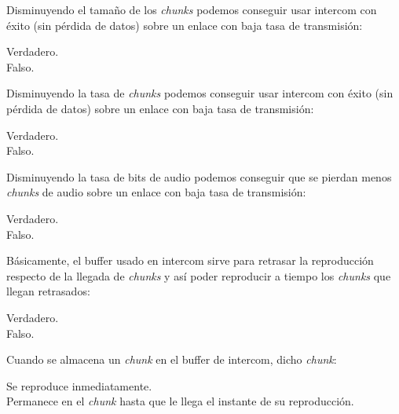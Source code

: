 \documentclass[legalpaper, 12pt, addpoints]{exam}
\begin{document}
\begin{questions}
\question Disminuyendo el tamaño de los \emph{chunks} podemos conseguir usar intercom con éxito (sin pérdida de datos) sobre un enlace con baja tasa de transmisión:

\begin{oneparchoices}
  \choice Verdadero.\\
  \choice Falso.
\end{oneparchoices}
  
\vspace{0.10in}

\question Disminuyendo la tasa de \emph{chunks} podemos conseguir usar intercom con éxito (sin pérdida de datos) sobre un enlace con baja tasa de transmisión:

\begin{oneparchoices}
  \choice Verdadero.\\
  \choice Falso.
\end{oneparchoices}
  
\vspace{0.10in}

\question Disminuyendo la tasa de bits de audio podemos conseguir que se pierdan menos \emph{chunks} de audio sobre un enlace con baja tasa de transmisión:

\begin{oneparchoices}
  \choice Verdadero.\\
  \choice Falso.
\end{oneparchoices}
  
\vspace{0.10in}

\question Básicamente, el buffer usado en intercom sirve para retrasar la reproducción respecto de la llegada de \emph{chunks} y así poder reproducir a tiempo los \emph{chunks} que llegan retrasados:

\begin{oneparchoices}
  \choice Verdadero.\\
  \choice Falso.
\end{oneparchoices}
  
\vspace{0.10in}

\question Cuando se almacena un \emph{chunk} en el buffer de intercom, dicho \emph{chunk}:

\begin{oneparchoices}
  \choice Se reproduce inmediatamente.\\
  \choice Permanece en el \emph{chunk} hasta que le llega el instante de su reproducción.
\end{oneparchoices}
  

\end{questions}
\end{document}
